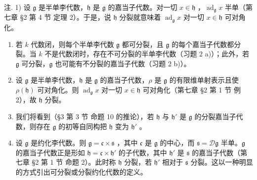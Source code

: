 注. 1) 设 \(\mathfrak{g}\) 是半单李代数，\(\mathfrak{h}\) 是 \(\mathfrak{g}\) 的嘉当子代数。对一切 \(x \in \mathfrak{h}\) ，\(\operatorname{ad}_{\mathfrak{g}} x\) 半单（第七章 §2 第 4 节 定理 2）。于是，说 \(\mathfrak{h}\) 分裂就意味着 \(\operatorname{ad}_{\mathfrak{g}} x\) 对一切 \(x \in \mathfrak{h}\) 可对角化。

\begin{enumerate}
\def\labelenumi{\arabic{enumi})}
\setcounter{enumi}{1}
\item
  若 \(k\) 代数闭，则每个半单李代数 \(\mathfrak{g}\) 都可分裂，且 \(\mathfrak{g}\) 的每个嘉当子代数都分裂。当 \(k\) 不是代数闭时，存在不可分裂的半单李代数（习题 2 a)）；此外，若 \(\mathfrak{g}\) 可分裂，\(\mathfrak{g}\) 也可能有不分裂的嘉当子代数（习题 2 b)）。
\item
  设 \(\mathfrak{g}\) 是半单李代数，\(\mathfrak{h}\) 是 \(\mathfrak{g}\) 的嘉当子代数，\(\rho\) 是 \(\mathfrak{g}\) 的有限维单射表示且使 \(\rho(\mathfrak{h})\) 可对角化。则 \(\operatorname{ad}_{\mathfrak{g}}x\) 对一切 \(x \in \mathfrak{h}\) 可对角化（第七章 §2 第 1 节 例 2），故 \(\mathfrak{h}\) 分裂。
\item
  我们将看到（§3 第 3 节 命题 10 的推论），若 \(\mathfrak{h}\) 与 \(\mathfrak{h}'\) 是 \(\mathfrak{g}\) 的分裂嘉当子代数，则存在 \(\mathfrak{g}\) 的初等自同构把 \(\mathfrak{h}\) 变为 \(\mathfrak{h}'\) 。
\item
  设 \(\mathfrak{g}\) 是约化李代数。则 \(\mathfrak{g} = \mathfrak{c} \times \mathfrak{s}\) ，其中 \(\mathfrak{c}\) 是 \(\mathfrak{g}\) 的中心，而 \(\mathfrak{s} = \mathcal{D}\mathfrak{g}\) 半单。\(\mathfrak{g}\) 的嘉当子代数正是形如 \(\mathfrak{h} = \mathfrak{c} \times \mathfrak{h}'\) 的子代数，其中 \(\mathfrak{h}'\) 是 \(\mathfrak{s}\) 的嘉当子代数（第七章 §2 第 1 节 命题 2）。此时称 \(\mathfrak{h}\) 分裂，若 \(\mathfrak{h}'\) 相对于 \(\mathfrak{s}\) 分裂。这以一种明显的方式引出可分裂或分裂约化代数的定义。
\end{enumerate}